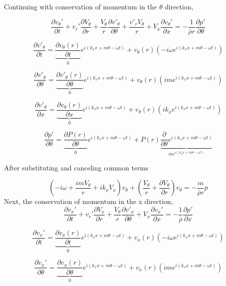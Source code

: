 Continuing with conservation of momentum in the $\theta$ direction,

\[\frac{\partial  v_{\theta}' }{\partial t} +
v_r' \frac{\partial  V_{\theta}  }{\partial r} +
\frac{V_{\theta}}{r} \frac{\partial v'_{\theta}}{\partial \theta} +
\frac{v'_rV_{\theta}}{r} +
V_x \frac{\partial v_{\theta}'}{\partial x} 
= -\frac{1}{\bar{\rho} r}	\frac{\partial p'}{\partial \theta}\]

\[\frac{\partial v'_{\theta}}{\partial t} = 
\underbrace{\frac{\partial v_{\theta}(r)}{\partial t}}_{0} e^{i\left(k_x x + m \theta - \omega t \right)} + 
v_{\theta}(r) \left(-i\omega e^{i\left(k_x x + m \theta - \omega t \right)}\right)\]

\[\frac{\partial v'_{\theta}}{\partial \theta} = \underbrace{\frac{\partial v'_{\theta}(r)}{\partial \theta}}_{0} e^{i\left(k_x x + m \theta - \omega t \right)} + v_{\theta}(r) \left(im e^{i\left(k_x x + m \theta - \omega t \right)}\right)\]

\[\frac{\partial v'_{\theta}}{\partial x} = \underbrace{\frac{\partial v_{\theta}(r)}{\partial x}}_{0} e^{i\left(k_x x + m \theta - \omega t \right)} + v_{\theta}(r) \left(ik_x e^{i\left(k_x x + m \theta - \omega t \right)}\right)\]

\[\frac{\partial p'}{\partial \theta} = \underbrace{\frac{\partial P(r)}{\partial \theta}}_{0} e^{i\left(k_x x + m \theta - \omega t \right)} + P(r)\underbrace{\frac{\partial}{\partial  \theta} e^{i\left(k_x x + m \theta - \omega t \right)}}_{m  e^{i\left(k_x x + m \theta - \omega t \right)}}\]



After substituting and canceling common terms 

\[\left(-i\omega + \frac{i m V_{\theta}}{r} + i k_x V_x \right) v_{\theta} + \left(\frac{V_{\theta}}{r} +  \frac{\partial V_{\theta}}{\partial r}\right)v_\theta= -\frac{m}{\bar{\rho}r}p\]
Next, the conservation of momentum in the x direction,
\[\frac{\partial  v_x' }{\partial t} +
v_r' \frac{\partial  V_x  }{\partial r} +
\frac{V_{\theta}}{r} \frac{\partial v'_x}{\partial \theta} +
V_x \frac{\partial v_x'}{\partial x} 
= -\frac{1    }{\bar{\rho}}  \frac{\partial p'}{\partial x} \]


\[\frac{\partial v_x'}{\partial t} = \underbrace{\frac{\partial v_x(r)}{\partial t}}_{0} e^{i\left(k_x x + m \theta - \omega t \right)} + 
v_x(r) \left(-i\omega e^{i\left(k_x x + m \theta - \omega t \right)}\right)\]

\[\frac{\partial v_x'}{\partial \theta} = \underbrace{\frac{\partial v_x(r)}{\partial \theta}}_{0} e^{i\left(k_x x + m \theta - \omega t \right)} + 
v_x(r) \left(im e^{i\left(k_x x + m \theta - \omega t \right)}\right)\]


